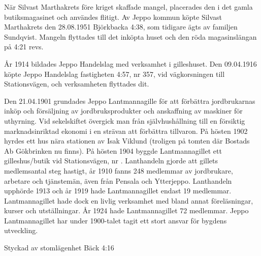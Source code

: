 När Silvast Marthakrets före kriget skaffade mangel, placerades den i det gamla butiksmagasinet och användes flitigt. Av Jeppo kommun köpte Silvast Marthakrets den 28.08.1951 Björkbacka 4:38, som tidigare ägts av familjen Sundqvist. Mangeln flyttades till det inköpta huset och den röda magasinslängan på 4:21 revs.


%
År 1914 bildades Jeppo Handelslag med verksamhet i gilleshuset. Den 09.04.1916 köpte Jeppo Handelslag fastigheten 4:57, nr 357, vid vägkorsningen till Stationsvägen, och verksamheten flyttades dit.


%
Den 21.04.1901 grundades Jeppo Lantmannagille för att förbättra jordbrukarnas inköp och försäljning av jordbruksprodukter och anskaffning av maskiner för uthyrning. Vid sekelskiftet övergick man från självhushållning till en försiktig marknadsinriktad ekonomi i en strävan att förbättra tillvaron. På hösten 1902 hyrdes ett hus nära stationen av Isak Viklund	(troligen på tomten där Bostads Ab Gökbrinken nu finns). På hösten 1904 byggde Lantmannagillet ett gilleshus/butik vid Stationsvägen, nr . Lanthandeln gjorde att gillets medlemsantal steg hastigt, år 1910 fanns	248 medlemmar av jordbrukare, arbetare och tjänstemän, även från 	Pensala och Ytterjeppo. Lanthandeln upphörde 1913 och år 1919 hade 	Lantmannagillet endast 19 medlemmar. Lantmannagillet hade dock en livlig verksamhet med bland annat föreläsningar, kurser och 	utställningar. År 1924 hade Lantmannagillet 72 medlemmar. Jeppo	Lantmannagillet har under 1900-talet tagit ett stort ansvar för bygdens utveckling.



%

Styckad av stomlägenhet Bäck 4:16


